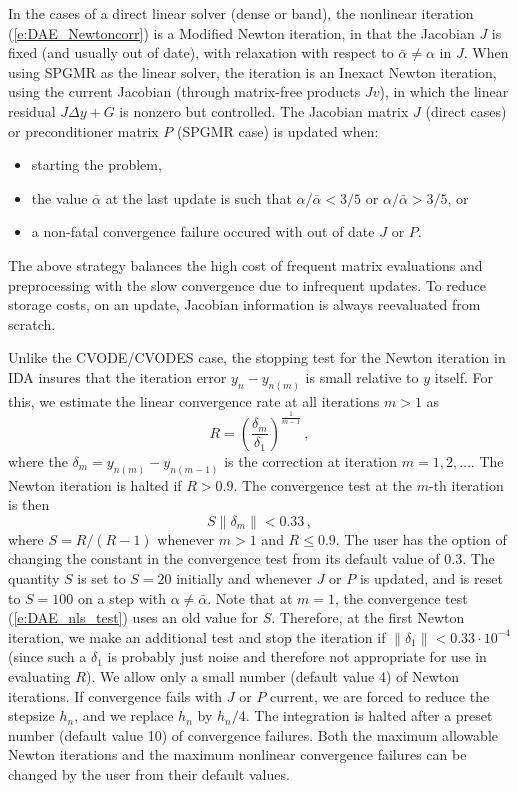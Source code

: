In the cases of a direct linear solver (dense or band), the nonlinear 
iteration (\ref{e:DAE_Newtoncorr}) is a Modified Newton iteration, in
that the Jacobian $J$ is fixed (and usually out of date), with
relaxation with respect to $\bar\alpha \neq \alpha$ in $J$. When using
SPGMR as the linear solver, the iteration is an Inexact Newton iteration,
using the current Jacobian (through matrix-free products $Jv$), in 
which the linear residual $J\Delta y + G$ is nonzero but controlled.
The Jacobian matrix $J$ (direct cases) or preconditioner matrix $P$ 
(SPGMR case) is updated when:
\begin{itemize}
\item starting the problem,
\item the value $\bar\alpha$ at the last update is such that
  $\alpha / {\bar\alpha} < 3/5$ or $\alpha / {\bar\alpha} > 3/5$, or
\item a non-fatal convergence failure occured with out of date $J$ or $P$.
\end{itemize}
The above strategy balances the high cost of frequent matrix evaluations
and preprocessing with the slow convergence due to infrequent updates.
To reduce storage costs, on an update, Jacobian information is always
reevaluated from scratch.

Unlike the CVODE/CVODES case, the stopping test for the Newton iteration
in IDA insures that the iteration error $y_n - y_{n(m)}$ is small relative
to $y$ itself. For this, we estimate the linear convergence rate at all 
iterations $m>1$ as
\begin{equation*}
R = \left( \frac{\delta_m}{\delta_1} \right)^{\frac{1}{m-1}} \, , 
\end{equation*}
where the $\delta_m = y_{n(m)} - y_{n(m-1)}$ is the correction at
iteration $m=1,2,\ldots$. The Newton iteration is halted if $R>0.9$.
The convergence test at the $m$-th iteration is then
\begin{equation}\label{e:DAE_nls_test}
S \| \delta_m \| < 0.33 \, ,
\end{equation}
where $S = R/(R-1)$ whenever $m>1$ and $R\le 0.9$. The user has the
option of changing the constant in the convergence test from its default 
value of $0.3$.
%
The quantity $S$ is set to $S=20$ initially and whenever $J$ or $P$ is
updated, and is reset to $S=100$ on a step with $\alpha \neq \bar\alpha$.
Note that at $m=1$, the convergence test (\ref{e:DAE_nls_test}) uses an old 
value for $S$. Therefore, at the first Newton iteration, we make an additional
test and stop the iteration if $\|\delta_1\| < 0.33 \cdot 10^{-4}$
(since such a $\delta_1$ is probably just noise and therefore not appropriate 
for use in evaluating $R$).
%
We allow only a small number (default value 4) of Newton iterations.
If convergence fails with $J$ or $P$ current, 
we are forced to reduce the stepsize $h_n$, and we replace $h_n$ by $h_n/4$.
The integration is halted after a preset number (default value 10)
of convergence failures. Both the maximum allowable Newton iterations
and the maximum nonlinear convergence failures can be changed by the user
from their default values.

